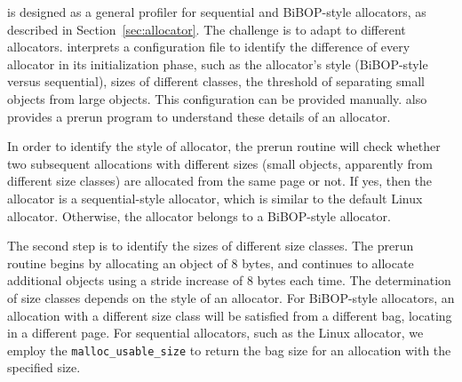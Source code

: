 \MP{} is designed as a general profiler for sequential and BiBOP-style allocators, as described in Section~\ref{sec:allocator}. The challenge is to adapt  to different allocators. \MP{} interprets a configuration file to identify the difference of every allocator in its initialization phase, such as the allocator's style (BiBOP-style versus sequential), sizes of different classes, the threshold of separating small objects from large objects. This configuration can be provided manually. \MP{} also provides a prerun program to understand these details of an allocator. 

In order to identify the style of allocator, the prerun routine will check whether two subsequent allocations with different sizes (small objects, apparently from different size classes) are allocated from the same page or not. If yes, then the allocator is a sequential-style allocator, which is similar to the default Linux allocator. Otherwise, the allocator belongs to a BiBOP-style allocator. 

The second step is to identify the sizes of different size classes. The prerun routine begins by allocating an object of 8 bytes, and continues to allocate additional objects using a stride increase of 8 bytes each time. The determination of size classes depends on the style of an allocator. For BiBOP-style allocators, an allocation with a different size class will be satisfied from a different bag, locating in a different page. For sequential allocators, such as the Linux allocator, we employ the \texttt{malloc\_usable\_size} to  return the bag size for an allocation with the specified size. 


